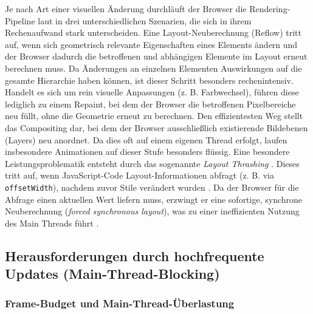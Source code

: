 Je nach Art einer visuellen Änderung durchläuft der Browser die Rendering-Pipeline laut \cite{web.dev_rendering_2023} in drei unterschiedlichen Szenarien, die sich in ihrem Rechenaufwand stark unterscheiden. Eine Layout-Neuberechnung (Reflow) tritt auf, wenn sich geometrisch relevante Eigenschaften eines Elements ändern und der Browser dadurch die betroffenen und abhängigen Elemente im Layout erneut berechnen muss. Da Änderungen an einzelnen Elementen Auswirkungen auf die gesamte Hierarchie haben können, ist dieser Schritt besonders rechenintensiv. Handelt es sich um rein visuelle Anpassungen (z. B. Farbwechsel), führen diese lediglich zu einem Repaint, bei dem der Browser die betroffenen Pixelbereiche neu füllt, ohne die Geometrie erneut zu berechnen. Den effizientesten Weg stellt das Compositing dar, bei dem der Browser ausschließlich existierende Bildebenen (Layers) neu anordnet. Da dies oft auf einem eigenen Thread erfolgt, laufen insbesondere Animationen auf dieser Stufe besonders flüssig. Eine besondere Leistungsproblematik entsteht durch das sogenannte \textit{Layout Thrashing} \cite{web.dev_layoutthrashing_2025}. Dieses tritt auf, wenn JavaScript-Code Layout-Informationen abfragt (z. B. via \texttt{offsetWidth}), nachdem zuvor Stile verändert wurden \cite{web.dev_layoutthrashing_2025}. Da der Browser für die Abfrage einen aktuellen Wert liefern muss, erzwingt er eine sofortige, synchrone Neuberechnung (\textit{forced synchronous layout}), was zu einer ineffizienten Nutzung des Main Threads führt \cite{web.dev_layoutthrashing_2025}.

\subsection{Herausforderungen durch hochfrequente Updates (Main-Thread-Blocking)}
\label{ss:main-thread-blocking}

\subsubsection{Frame-Budget und Main-Thread-Überlastung}
\label{sss:frame-budget}

